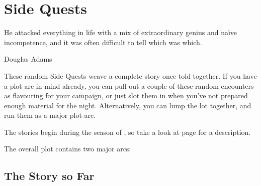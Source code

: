 \chapter{Side Quests}
  \epigraph{He attacked everything in life with a mix of extraordinary genius and na\"ive incompetence, and it was often difficult to tell which was which.}{Douglas Adams}

\begin{multicols}{2}

\noindent
These random Side Quests weave a complete story once told together.
If you have a plot-arc in mind already, you can pull out a couple of these random encounters as flavouring for your campaign, or just slot them in when you've not prepared enough material for the night.
Alternatively, you can lump the lot together, and run them as a major plot-arc.

The stories begin during the season of \season, so take a look at page \pageref{astronomy} for a description.

The overall plot contains two major arcs:

\end{multicols}

\section{The Story so Far}

